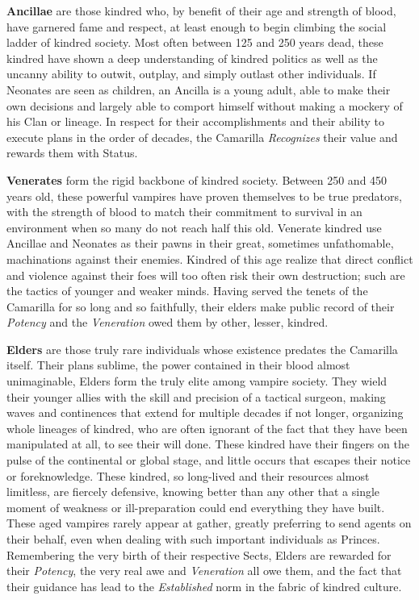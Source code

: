 \textbf{Ancillae} are those kindred who, by benefit of their age and strength of blood, have garnered 
fame and respect, at least enough to begin climbing the social ladder of kindred society.  Most often 
between 125 and 250 years dead, these kindred have shown a deep understanding of kindred politics as 
well as the uncanny ability to outwit, outplay, and simply outlast other individuals.  If Neonates are 
seen as children, an Ancilla is a young adult, able to make their own decisions and largely able to 
comport himself without making a mockery of his Clan or lineage.  In respect for their accomplishments 
and their ability to execute plans in the order of decades, the Camarilla \emph{Recognizes} their value 
and rewards them with Status.

\textbf{Venerates} form the rigid backbone of kindred society.  Between 250 and 450 years old, these 
powerful vampires have proven themselves to be true predators, with the strength of blood to match 
their commitment to survival in an environment when so many do not reach half this old.  Venerate 
kindred use Ancillae and Neonates as their pawns in their great, sometimes unfathomable, machinations 
against their enemies.  Kindred of this age realize that direct conflict and violence against their foes 
will too often risk their own destruction; such are the tactics of younger and weaker minds.  Having 
served the tenets of the Camarilla for so long and so faithfully, their elders make public record of 
their \emph{Potency} and the \emph{Veneration} owed them by other, lesser, kindred.

\textbf{Elders} are those truly rare individuals whose existence predates the Camarilla itself.  
Their plans sublime, the power contained in their blood almost unimaginable, Elders form the truly 
elite among vampire society.  They wield their younger allies with the skill and precision of a 
tactical surgeon, making waves and continences that extend for multiple decades if not longer, organizing 
whole lineages of kindred, who are often ignorant of the fact that they have been manipulated at all, 
to see their will done.  These kindred have their fingers on the pulse of the continental or global 
stage, and little occurs that escapes their notice or foreknowledge.  These kindred, so long-lived and 
their resources almost limitless, are fiercely defensive, knowing better than any other that a single 
moment of weakness or ill-preparation could end everything they have built.  These aged vampires rarely 
appear at gather, greatly preferring to send agents on their behalf, even when dealing with such 
important individuals as Princes.  Remembering the very birth of their respective Sects, Elders are 
rewarded for their \emph{Potency}, the very real awe and \emph{Veneration} all owe them, and the fact 
that their guidance has lead to the \emph{Established} norm in the fabric of kindred culture.

